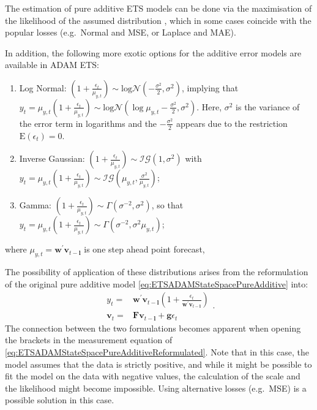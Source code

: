 \documentclass[
]{book}
\providecommand{\tightlist}{%
  \setlength{\itemsep}{0pt}\setlength{\parskip}{0pt}}
\theoremstyle{definition}
\theoremstyle{definition}
\theoremstyle{definition}
\theoremstyle{definition}
\theoremstyle{remark}
\begin{document}
The estimation of pure additive ETS models can be done via the maximisation of the likelihood of the assumed distribution \citep[see Chapter 13 of][]{SvetunkovSBA}, which in some cases coincide with the popular losses (e.g.~Normal and MSE, or Laplace and MAE).

In addition, the following more exotic options for the additive error models are available in ADAM ETS:

\begin{enumerate}
\def\labelenumi{\arabic{enumi}.}
\tightlist
\item
  Log Normal: \(\left(1+\frac{\epsilon_t}{\mu_{y,t}} \right) \sim \text{log}\mathcal{N}\left(-\frac{\sigma^2}{2}, \sigma^2\right)\), implying that \(y_t = \mu_{y,t} \left(1+\frac{\epsilon_t}{\mu_{y,t}} \right) \sim \text{log}\mathcal{N}\left(\log\mu_{y,t} -\frac{\sigma^2}{2}, \sigma^2\right)\).
  Here, \(\sigma^2\) is the variance of the error term in logarithms and the \(-\frac{\sigma^2}{2}\) appears due to the restriction \(\text{E}(\epsilon_t)=0\).
\item
  Inverse Gaussian: \(\left(1+\frac{\epsilon_t}{\mu_{y,t}} \right) \sim \mathcal{IG}(1, \sigma^2)\) with \(y_t=\mu_{y,t} \left(1+\frac{\epsilon_t}{\mu_{y,t}} \right) \sim \mathcal{IG}\left(\mu_{y,t}, \frac{\sigma^2}{\mu_{y,t}}\right)\);
\item
  Gamma: \(\left(1+\frac{\epsilon_t}{\mu_{y,t}} \right) \sim \mathcal{\Gamma}(\sigma^{-2}, \sigma^2)\), so that \(y_t = \mu_{y,t} \left(1+\frac{\epsilon_t}{\mu_{y,t}} \right) \sim \mathcal{\Gamma}(\sigma^{-2}, \sigma^2 \mu_{y,t})\);
\end{enumerate}

where \(\mu_{y,t} = \mathbf{w}^\prime \mathbf{v}_{t-\mathbf{l}}\) is one step ahead point forecast,

The possibility of application of these distributions arises from the reformulation of the original pure additive model \eqref{eq:ETSADAMStateSpacePureAdditive} into:
\begin{equation}
  \begin{aligned}
    {y}_{t} = &\mathbf{w}^\prime \mathbf{v}_{t-\mathbf{l}}\left(1 + \frac{\epsilon_t}{\mathbf{w}^\prime \mathbf{v}_{t-\mathbf{l}}}\right) \\
    \mathbf{v}_{t} = &\mathbf{F} \mathbf{v}_{t-\mathbf{l}} + \mathbf{g} \epsilon_t
  \end{aligned}.
  \label{eq:ETSADAMStateSpacePureAdditiveReformulated}
\end{equation}
The connection between the two formulations becomes apparent when opening the brackets in the measurement equation of \eqref{eq:ETSADAMStateSpacePureAdditiveReformulated}. Note that in this case, the model assumes that the data is strictly positive, and while it might be possible to fit the model on the data with negative values, the calculation of the scale and the likelihood might become impossible. Using alternative losses (e.g.~MSE) is a possible solution in this case.
\end{document}
